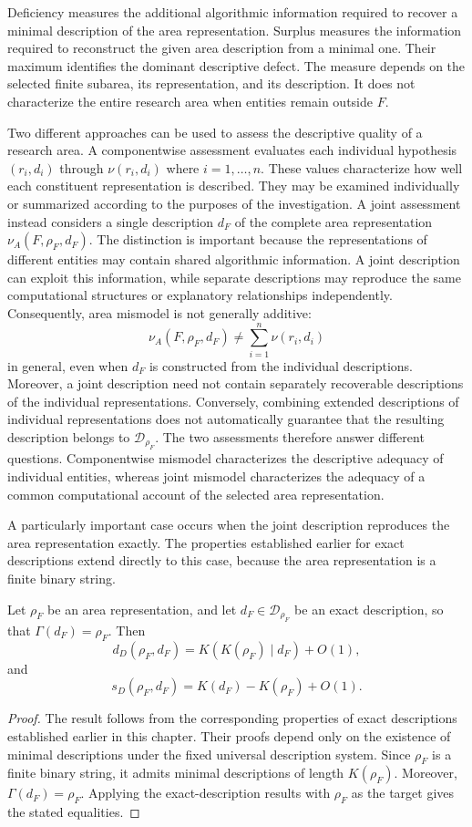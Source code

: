 Deficiency measures the additional algorithmic information required to recover a minimal description of the area representation. Surplus measures the information required to reconstruct the given area description from a minimal one. Their maximum identifies the dominant descriptive defect. The measure depends on the selected finite subarea, its representation, and its description. It does not characterize the entire research area when entities remain outside $F$.

Two different approaches can be used to assess the  descriptive quality of a research area. A componentwise assessment evaluates each individual hypothesis $(r_i,d_i)$ through $\nu(r_i,d_i)$ where $i=1,\ldots,n$. These values characterize how well each constituent representation is described. They may be examined individually or summarized according to the purposes of the investigation. A joint assessment instead considers a single description $d_F$ of the complete area representation $\nu_A(F,\rho_F,d_F)$. The distinction is important because the representations of different entities may contain shared algorithmic information. A joint description can exploit this information, while separate descriptions may reproduce the same computational structures or explanatory relationships independently. Consequently, area mismodel is not generally additive:
\[
\nu_A(F,\rho_F,d_F) \neq \sum_{i=1}^{n}\nu(r_i,d_i)
\]
in general, even when $d_F$ is constructed from the individual descriptions. Moreover, a joint description need not contain separately recoverable descriptions of the individual representations. Conversely, combining extended descriptions of individual representations does not automatically guarantee that the resulting description belongs to $\mathcal D_{\rho_F}$. The two assessments therefore answer different questions. Componentwise mismodel characterizes the descriptive adequacy of individual entities, whereas joint mismodel characterizes the adequacy of a common computational account of the selected area representation.

A particularly important case occurs when the joint description reproduces the area representation exactly. The properties established earlier for exact descriptions extend directly to this case, because the area representation is a finite binary string.

\begin{proposition}
\label{prop:exact_area_mismodel}
Let $\rho_F$ be an area representation, and let $d_F\in\mathcal D_{\rho_F}$ be an exact description, so that $\Gamma(d_F)=\rho_F$. Then
\[
d_D(\rho_F,d_F) = K(K(\rho_F)\mid d_F)+O(1),
\]
and
\[
s_D(\rho_F,d_F) = K(d_F)-K(\rho_F)+O(1).
\]
\end{proposition}
\begin{proof}
The result follows from the corresponding properties of exact descriptions established earlier in this chapter. Their proofs depend only on the existence of minimal descriptions under the fixed universal description system. Since $\rho_F$ is a finite binary string, it admits minimal descriptions of length $K(\rho_F)$. Moreover, $\Gamma(d_F)=\rho_F$. Applying the exact-description results with $\rho_F$ as the target gives the stated equalities.
\end{proof}


